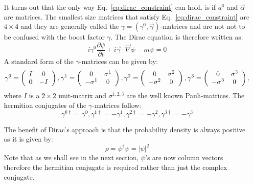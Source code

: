 \\\\

It turns out that the only way Eq.~\ref{eq:dirac_constraint} can hold, is if $a^0$ and $\vec{\alpha}$ are matrices. The smallest size matrices that satisfy Eq.~\ref{eq:dirac_constraint} are $4\times4$ and they are generally called the $\gamma=(\gamma^0,\vec{\gamma})$-matrices and are not not to be confused with the boost factor $\gamma$.
The Dirac equation is therefore written as:
\begin{equation}
\label{eq:dirac_equation}
i\gamma^0\frac{\partial\psi}{\partial t}+i\vec{\gamma}\cdot \vec{\nabla}\psi-m\psi=0
\end{equation}
A standard form of the $\gamma$-matrices can be given by:
\begin{equation}
\gamma^0= \left( \begin{array}{cc} I & 0 \\ 0 & -I \end{array} \right), \gamma^1= \left( \begin{array}{cc} 0 & \sigma^1 \\ -\sigma^1 & 0 \end{array} \right),
\gamma^2= \left( \begin{array}{cc} 0 & \sigma^2 \\ -\sigma^2 & 0 \end{array} \right),
\gamma^3= \left( \begin{array}{cc} 0 & \sigma^3 \\ -\sigma^3 & 0 \end{array} \right),
\end{equation}
where $I$ is a $2\times2$ unit-matrix and $\sigma^{1,2,3}$ are the well known Pauli-matrices.
The hermition conjugates of the $\gamma$-matrices follow:
\begin{equation}
\gamma^{0\dagger}=\gamma^0,\gamma^{1\dagger}=-\gamma^1,\gamma^{2\dagger}=-\gamma^2,\gamma^{3\dagger}=-\gamma^3
\end{equation}

The benefit of Dirac's approach is that the probability density is always positive as it is given by:
\[
\rho=\psi^\dagger\psi=|\psi|^2
\]
Note that as we shall see in the next section, $\psi$'s are now column vectors therefore the hermitian conjugate is required rather than just the complex conjugate.


